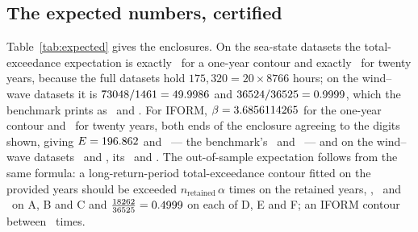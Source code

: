 \documentclass[preprint,11pt,authoryear]{elsarticle}
\begin{document}
\subsection{The expected numbers, certified}
Table~\ref{tab:expected} gives the enclosures. On the sea-state datasets the total-exceedance expectation is exactly \EExpTotalOne\ for a one-year contour and exactly \EExpTotalTwenty\ for twenty years, because the full datasets hold $175{,}320 = 20 \times 8766$ hours; on the wind--wave datasets it is $73048/1461 = 49.9986$ and $36524/36525 = 0.9999$, which the benchmark prints as \EPrintedTotalDOne\ and \EPrintedTotalDFifty. For IFORM, $\beta = 3.6856114265$ for the one-year contour and \EExpBetaTwenty\ for twenty years, both ends of the enclosure agreeing to the digits shown, giving $E = 196.862$ and \EExpIformTwenty\ --- the benchmark's \EPrintedIformOne\ and \EPrintedIformTwenty\ --- and on the wind--wave datasets \EExpIformDOne\ and \EExpIformDFifty, its \EPrintedIformDOne\ and \EPrintedIformDFifty. The out-of-sample expectation follows from the same formula: a long-return-period total-exceedance contour fitted on the provided years should be exceeded $n_{\mathrm{retained}}\,\alpha$ times on the retained years, \ERetTotalA, \ERetTotalB\ and \ERetTotalC\ on A, B and C and $\frac{18262}{36525} = 0.4999$ on each of D, E and F; an IFORM contour between \ERetIformRange\ times.

\begin{table}[t]
\centering\scriptsize
\caption{The benchmark's Table 1 certified: for $n$ hourly states and a $T$-year contour, the hourly exceedance probability $\alpha$ as an exact rational, the total-exceedance expectation $n\alpha$ (exact) against the printed value, and the IFORM expectation $n\exp(-\beta^2/2)$ with $\beta = \Phi^{-1}(1-\alpha)$ as enclosures against the printed value. Where an enclosure's two ends agree to the digits shown, one number is printed.}
\label{tab:expected}
\end{table}
\end{document}
